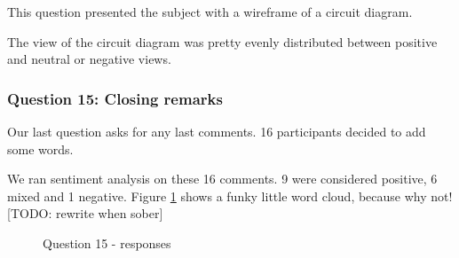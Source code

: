 This question presented the subject with a wireframe of a circuit diagram.

The view of the circuit diagram was pretty evenly distributed between positive and neutral or negative views.

\subsubsection{Question 15: Closing remarks}

Our last question asks for any last comments.
16 participants decided to add some words.

We ran sentiment analysis on these 16 comments.
9 were considered positive, 6 mixed and 1 negative.
Figure \ref{fig:Q15_wordcloud} shows a funky little word cloud, because why not! [TODO: rewrite when sober]

\begin{figure}[H]
    \centering
    \caption{Question 15 - responses}
    \label{fig:Q15_wordcloud}
\end{figure}

